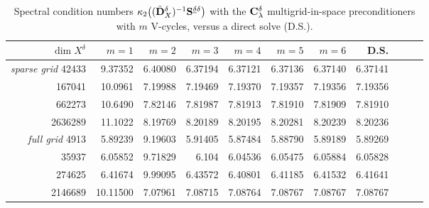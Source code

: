 \documentclass[11pt,a4paper,oneside,english]{amsart}
\numberwithin{equation}{section}
\numberwithin{theorem}{section}
\theoremstyle{definition}
\newcommand{\udelta}{{\underline{\delta}}}
\newcommand{\jw}[1]{{\color{red}{JW: #1}}}
\begin{document}
\begin{table}
  \begin{tabular}{rrrrrrrrrrr}\toprule
    $\dim X^\delta$ & $m=1$ & $m=2$ & $m=3$ & $m=4$ & $m=5$ & $m=6$ & D.S.\\\midrule
    \emph{sparse grid} \quad
    42433    & 9.37352  & 6.40080& 6.37194& 6.37121& 6.37136&6.37140 & 6.37141\\
    167041   & 10.0961  & 7.19988& 7.19469& 7.19370& 7.19357&7.19356 & 7.19356\\
    662273   & 10.6490  & 7.82146& 7.81987& 7.81913& 7.81910&7.81909 & 7.81910\\
    2636289  & 11.1022  & 8.19769& 8.20189& 8.20195& 8.20281& 8.20239& 8.20236 \\
    \midrule
    \emph{full grid} \quad
    4913    & 5.89239  & 9.19603  & 5.91405  & 5.87484  & 5.88790   & 5.89189  & 5.89269 \\
    35937   & 6.05852  & 9.71829  & 6.104    & 6.04536  & 6.05475  & 6.05884  & 6.05828 \\
    274625  & 6.41674  & 9.99095  & 6.43572  & 6.40801  & 6.41185  & 6.41532  & 6.41641 \\
    2146689  & 10.11500  & 7.07961& 7.08715& 7.08764& 7.08767& 7.08767 & 7.08767
    \\\bottomrule
  \end{tabular}
  \caption{Spectral condition numbers $\kappa_2\big((\tilde {\bf D}_X^\delta)^{-1} {\bf S}^{\udelta \delta}\big)$ with the ${\bf C}_\lambda^\delta$ multigrid-in-space preconditioners with $m$ V-cycles, versus a direct solve (D.S.).\jw{wording; ik wacht nog op numres}}
  \label{table:DX-precond}
\end{table}
\end{document}
